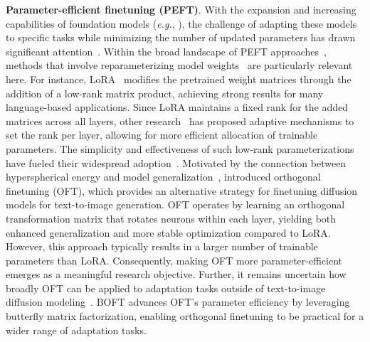 \textbf{Parameter-efficient finetuning (PEFT)}. With the expansion and increasing capabilities of foundation models (\emph{e.g.}, \cite{brown2020language,radford2021learning,rombach2022high,kirillov2023segment}), the challenge of adapting these models to specific tasks while minimizing the number of updated parameters has drawn significant attention~\cite{treviso2023efficient,ding2023parameter,lialin2023scaling}. Within the broad landscape of PEFT approaches~\cite{houlsby2019parameter,aghajanyan2020intrinsic,hulora2022,edalati2022krona,wang2022adamix,gheini2021cross,zaken2022bitfit,guo2020parameter,sung2021training,ansell2022composable,lester2021power,li2021prefix,vu2022spot,he2021towards,mao2021unipelt,karimi2021compacter,liu2022few,sung2022lst,chen2022parameter,jia2022visual,chen2022adaptformer,zhang2022neural,jie2023fact,lian2022scaling,luo2023towards}, methods that involve reparameterizing model weights~\cite{aghajanyan2020intrinsic,hulora2022,edalati2022krona} are particularly relevant here. For instance, LoRA~\cite{hulora2022} modifies the pretrained weight matrices through the addition of a low-rank matrix product, achieving strong results for many language-based applications. Since LoRA maintains a fixed rank for the added matrices across all layers, other research~\cite{zhang2022adaptive,valipour2022dylora,zhang2023increlora} has proposed adaptive mechanisms to set the rank per layer, allowing for more efficient allocation of trainable parameters. The simplicity and effectiveness of such low-rank parameterizations have fueled their widespread adoption~\cite{dettmers2023qlora,zi2023delta,chavan2023one}. Motivated by the connection between hyperspherical energy and model generalization~\cite{liu2018learning,liu2021orthogonal}, \cite{qiu2023controlling} introduced orthogonal finetuning (OFT), which provides an alternative strategy for finetuning diffusion models for text-to-image generation. OFT operates by learning an orthogonal transformation matrix that rotates neurons within each layer, yielding both enhanced generalization and more stable optimization compared to LoRA. However, this approach typically results in a larger number of trainable parameters than LoRA. Consequently, making OFT more parameter-efficient emerges as a meaningful research objective. Further, it remains uncertain how broadly OFT can be applied to adaptation tasks outside of text-to-image diffusion modeling~\cite{qiu2023controlling}. BOFT advances OFT's parameter efficiency by leveraging butterfly matrix factorization, enabling orthogonal finetuning to be practical for a wider range of adaptation tasks.

